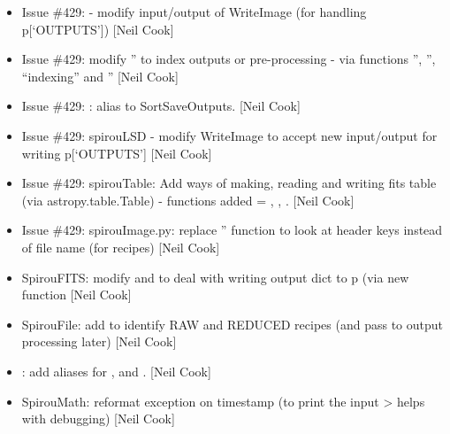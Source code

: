 \documentclass[a4paper,10pt,english]{report}
\begin{document}
\begin{itemize}
\item {} 
Issue \#429:  - modify input/output of WriteImage (for
handling p{[}‘OUTPUTS’{]}) {[}Neil Cook{]}

\item {} 
Issue \#429:  modify ” to index outputs
or pre-processing - via functions ”, ”,
“indexing” and ” {[}Neil Cook{]}

\item {} 
Issue \#429: : alias  to
SortSaveOutputs. {[}Neil Cook{]}

\item {} 
Issue \#429: spirouLSD - modify WriteImage to accept new input/output
for writing p{[}‘OUTPUTS’{]} {[}Neil Cook{]}

\item {} 
Issue \#429: spirouTable: Add ways of making, reading and writing fits
table (via astropy.table.Table) - functions added = ,
, . {[}Neil Cook{]}

\item {} 
Issue \#429: spirouImage.py: replace ” function
to look at header keys instead of file name (for  recipes)
{[}Neil Cook{]}

\item {} 
SpirouFITS: modify  and  to deal with
writing output dict to p (via new function  {[}Neil
Cook{]}

\item {} 
SpirouFile: add  to identify RAW and REDUCED recipes (and pass
to output processing later) {[}Neil Cook{]}

\item {} 
: add aliases for , 
and . {[}Neil Cook{]}

\item {} 
SpirouMath: reformat exception on timestamp (to print the input \textendash{}\textgreater{}
helps with debugging) {[}Neil Cook{]}


\end{itemize}
\end{document}
